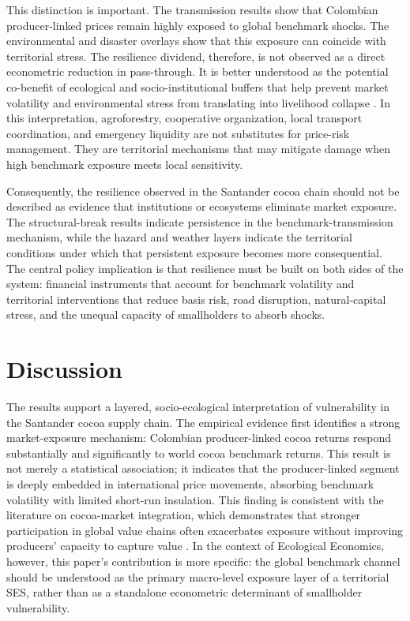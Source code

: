 \documentclass[11pt]{article}
\begin{document}
This distinction is important. The transmission results show that Colombian producer-linked prices remain highly exposed to global benchmark shocks. The environmental and disaster overlays show that this exposure can coincide with territorial stress. The resilience dividend, therefore, is not observed as a direct econometric reduction in pass-through. It is better understood as the potential co-benefit of ecological and socio-institutional buffers that help prevent market volatility and environmental stress from translating into livelihood collapse \citep{Mechler2025,Zurek2022}. In this interpretation, agroforestry, cooperative organization, local transport coordination, and emergency liquidity are not substitutes for price-risk management. They are territorial mechanisms that may mitigate damage when high benchmark exposure meets local sensitivity.

Consequently, the resilience observed in the Santander cocoa chain should not be described as evidence that institutions or ecosystems eliminate market exposure. The structural-break results indicate persistence in the benchmark-transmission mechanism, while the hazard and weather layers indicate the territorial conditions under which that persistent exposure becomes more consequential. The central policy implication is that resilience must be built on both sides of the system: financial instruments that account for benchmark volatility and territorial interventions that reduce basis risk, road disruption, natural-capital stress, and the unequal capacity of smallholders to absorb shocks.

\section{Discussion}
\label{sec:discussion}

The results support a layered, socio-ecological interpretation of vulnerability in the Santander cocoa supply chain. The empirical evidence first identifies a strong market-exposure mechanism: Colombian producer-linked cocoa returns respond substantially and significantly to world cocoa benchmark returns. This result is not merely a statistical association; it indicates that the producer-linked segment is deeply embedded in international price movements, absorbing benchmark volatility with limited short-run insulation. This finding is consistent with the literature on cocoa-market integration, which demonstrates that stronger participation in global value chains often exacerbates exposure without improving producers' capacity to capture value \citep{TsowouGayi2019,Jumah2001,MeyerCramon2004}. In the context of Ecological Economics, however, this paper’s contribution is more specific: the global benchmark channel should be understood as the primary macro-level exposure layer of a territorial SES, rather than as a standalone econometric determinant of smallholder vulnerability.
\end{document}
